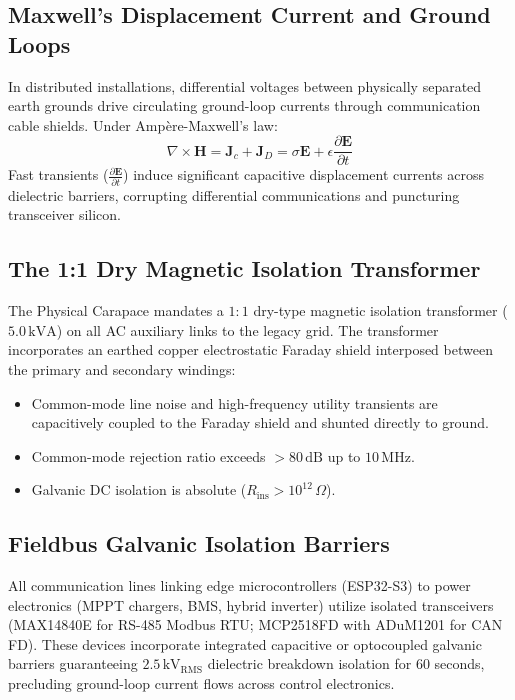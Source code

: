 \subsection{Maxwell's Displacement Current and Ground Loops}
In distributed installations, differential voltages between physically separated earth grounds drive circulating ground-loop currents through communication cable shields. Under Ampère-Maxwell's law:
\begin{equation}
\nabla \times \mathbf{H} = \mathbf{J}_c + \mathbf{J}_D = \sigma \mathbf{E} + \epsilon \frac{\partial \mathbf{E}}{\partial t}
\label{eq:ampere_maxwell}
\end{equation}
Fast transients ($\frac{\partial \mathbf{E}}{\partial t}$) induce significant capacitive displacement currents across dielectric barriers, corrupting differential communications and puncturing transceiver silicon.

\subsection{The 1:1 Dry Magnetic Isolation Transformer}
The Physical Carapace mandates a $1:1$ dry-type magnetic isolation transformer ($5.0\,\mathrm{kVA}$) on all AC auxiliary links to the legacy grid. The transformer incorporates an earthed copper electrostatic Faraday shield interposed between the primary and secondary windings:
\begin{itemize}
    \item Common-mode line noise and high-frequency utility transients are capacitively coupled to the Faraday shield and shunted directly to ground.
    \item Common-mode rejection ratio exceeds $>80\,\mathrm{dB}$ up to $10\,\mathrm{MHz}$.
    \item Galvanic DC isolation is absolute ($R_{\mathrm{ins}} > 10^{12}\,\Omega$).
\end{itemize}

\subsection{Fieldbus Galvanic Isolation Barriers}
All communication lines linking edge microcontrollers (ESP32-S3) to power electronics (MPPT chargers, BMS, hybrid inverter) utilize isolated transceivers (MAX14840E for RS-485 Modbus RTU; MCP2518FD with ADuM1201 for CAN FD). These devices incorporate integrated capacitive or optocoupled galvanic barriers guaranteeing $2.5\,\mathrm{kV}_{\mathrm{RMS}}$ dielectric breakdown isolation for 60 seconds, precluding ground-loop current flows across control electronics.

